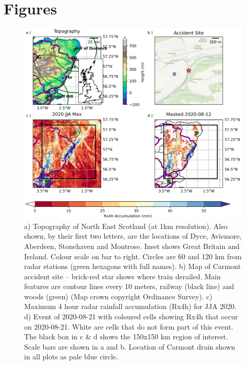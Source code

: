\documentclass[11pt,a4paper]{article}
\begin{document}
\section*{Figures}
\begin{figure}[ht!] %
	
	\centering
	\includegraphics[width=\linewidth]{carmont_geog_group}
	\caption{a) Topography of North East Scotland (at 1km resolution). Also shown, by their first two letters, are the locations of Dyce, Aviemore, Aberdeen, Stonehaven and Montrose. Inset shows Great Britain and Ireland. Colour scale on bar to right. Circles are  60 and 120 km from radar stations (green hexagons with full names). b)  Map of Carmont accident site -- brick-red star shows where train derailed. Main features are contour lines every 10 meters, railway (black line) and woods (green) (Map crown copyright Ordinance Survey).  c) Maximum 4 hour radar rainfall accumulation (Rx4h)  for JJA 2020. d) Event of 2020-08-21 with coloured cells showing Rx4h that occur on 2020-08-21.  White are cells that do not form part of this event.  The black box in c \& d shows the 150x150 km region of interest. Scale bars are shown in a and b. Location of Carmont drain shown in all plots as pale blue circle.  }
	\label{fig:carmont_geog_group}
\end{figure}
\clearpage
\end{document}
